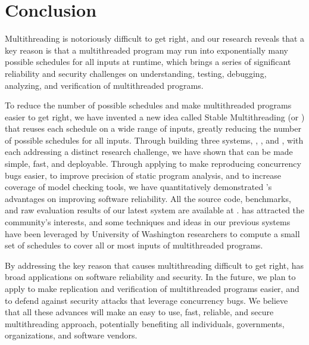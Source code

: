 \chapter{Conclusion} \label{sec:conclusion}

Multithreading is notoriously difficult to get right, and our research reveals
that a key reason is that a multithreaded program may run into exponentially 
many
possible schedules for all inputs at runtime, which brings a series of
significant reliability and security challenges on understanding,
testing, debugging, analyzing, and verification of multithreaded
programs.

To reduce the number of possible schedules and make multithreaded
programs easier to get right, we have invented a new idea called Stable
Multithreading (or \smt) that reuses each schedule on a wide range of inputs,
greatly reducing the number of possible schedules for all inputs. Through
building three \smt systems, \tern, \peregrine, and \parrot, with each 
addressing
a distinct research challenge, we have shown that \smt can be made simple, fast,
and deployable. Through applying \smt to make reproducing concurrency bugs
easier, to improve precision of static program analysis, and to increase
coverage of model checking tools, we have quantitatively demonstrated \smt's 
advantages on improving software reliability. All the source code,
benchmarks, and raw evaluation results of our latest \smt system \parrot are
available at \github. \smt has attracted the community's interests, and some 
techniques and ideas in our previous systems have been leveraged by 
University of Washington researchers to compute a small set of schedules to 
cover all or most inputs of multithreaded programs.

By addressing the key reason that causes multithreading difficult to get right,
\smt has broad applications on software reliability and security. In the 
future, we plan to apply \smt to make replication and verification of 
multithreaded programs easier, and to defend against security attacks 
that leverage concurrency bugs. We believe that all these advances will 
make \smt an easy to use, fast, reliable, and secure multithreading approach, 
potentially benefiting all individuals, governments, organizations, and 
software vendors. 